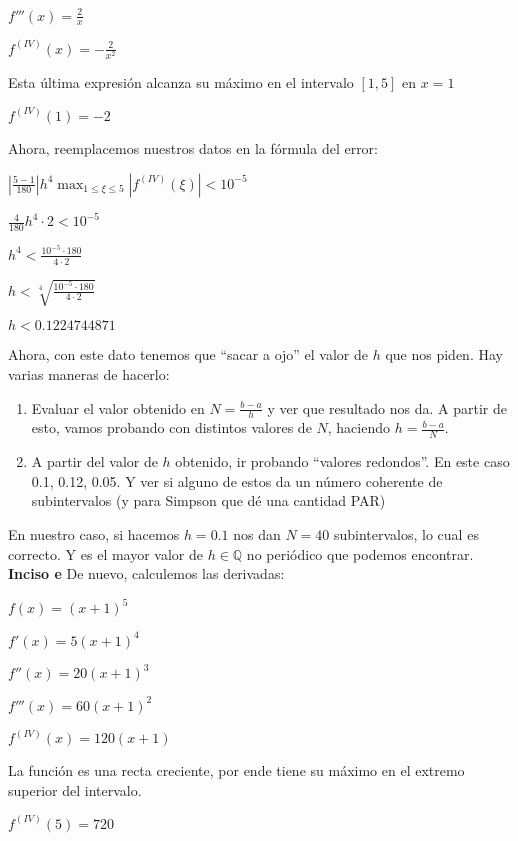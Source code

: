 \documentclass[11pt]{article}
\begin{document}
	$\displaystyle f'''(x)=\frac{2}{x}$
	
	$\displaystyle f^{(IV)}(x)=-\frac{2}{x^2}$
	
	Esta última expresión alcanza su máximo en el intervalo $[1,5]$ en $x=1$
	
	$\displaystyle f^{(IV)}(1)=-2$
	
	Ahora, reemplacemos nuestros datos en la fórmula del error:
	
	$\displaystyle \left| \frac{5-1}{180} \right|h^4 \max_{1\le \xi \le 5}\left| f^{(IV)}(\xi) \right|<10^{-5}$
	
	$\displaystyle \frac{4}{180} h^4 \cdot 2 <10^{-5}$
	
	$\displaystyle h^4<\frac{10^{-5}\cdot 180}{4\cdot 2}$
	
	$\displaystyle h<\sqrt[4]{\frac{10^{-5}\cdot 180}{4\cdot 2}}$
	
	$h<0.1224744871$
	
	Ahora, con este dato tenemos que ``sacar a ojo'' el valor de $h$ que nos piden. Hay varias maneras de hacerlo:
	
	\begin{enumerate}
		\item Evaluar el valor obtenido en $N=\frac{b-a}{h}$ y ver que resultado nos da. A partir de esto, vamos probando con distintos valores de $N$, haciendo $h=\frac{b-a}{N}$.
		\item A partir del valor de $h$ obtenido, ir probando ``valores redondos''. En este caso 0.1, 0.12, 0.05. Y ver si alguno de estos da un número coherente de subintervalos (y para Simpson que dé una cantidad PAR)
	\end{enumerate}

	En nuestro caso, si hacemos $h=0.1$ nos dan $N=40$ subintervalos, lo cual es correcto. Y es el mayor valor de $h \in \mathbb{Q}$ no periódico que podemos encontrar.\\
	
	\textbf{Inciso e}
	De nuevo, calculemos las derivadas:
	
	$f(x)=(x+1)^5$
	
	$f'(x)=5(x+1)^{4}$
	
	$f''(x)=20(x+1)^{3}$
	
	$f'''(x)=60(x+1)^{2}$
	
	$f^{(IV)}(x)=120(x+1)$
	
	La función es una recta creciente, por ende tiene su máximo en el extremo superior del intervalo.
	
	$f^{(IV)}(5)=720$
	
\end{document}
